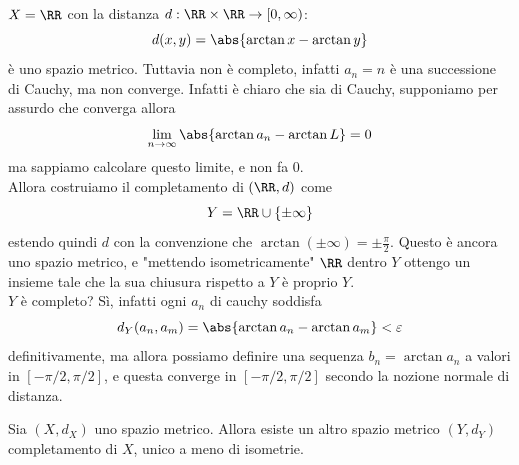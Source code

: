 \documentclass[11pt]{scrartcl}
\begin{document}
  	\begin{example}
  		$X=\RR$ con la distanza $d:\RR\times\RR \to [0,\infty)$:
  		$$d(x,y)=\abs{\arctan x - \arctan y}$$
  		è uno spazio metrico. Tuttavia non è completo, infatti $a_n=n$ è una successione di Cauchy, ma non converge. Infatti è chiaro che sia di Cauchy, supponiamo per assurdo che converga allora
  		$$\lim_{n\to\infty}\abs{\arctan a_n - \arctan L}=0$$
  		ma sappiamo calcolare questo limite, e non fa $0$. \\
  		Allora costruiamo il completamento di $(\RR,d)$ come
  		$$Y=\RR\cup \left\{\pm\infty\right\}$$
  		estendo quindi $d$ con la convenzione che $\arctan(\pm\infty)=\pm\frac{\pi}{2}$. Questo è ancora uno spazio metrico, e "mettendo isometricamente" $\RR$ dentro $Y$ ottengo un insieme tale che la sua chiusura rispetto a $Y$ è proprio $Y$. \\
  		$Y$ è completo? Sì, infatti ogni $a_n$ di cauchy soddisfa
  		$$d_Y(a_n,a_m)=\abs{\arctan a_n - \arctan a_m}<\varepsilon$$
  		definitivamente, ma allora possiamo definire una sequenza $b_n=\arctan a_n$ a valori in $[-\pi/2,\pi/2]$, e questa converge in $[-\pi/2,\pi/2]$ secondo la nozione normale di distanza.
  	\end{example}
  	\begin{theorem}
  		Sia $(X,d_X)$ uno spazio metrico. Allora esiste un altro spazio metrico $(Y,d_Y)$ completamento di $X$, unico a meno di isometrie.
  	\end{theorem}
\end{document}
